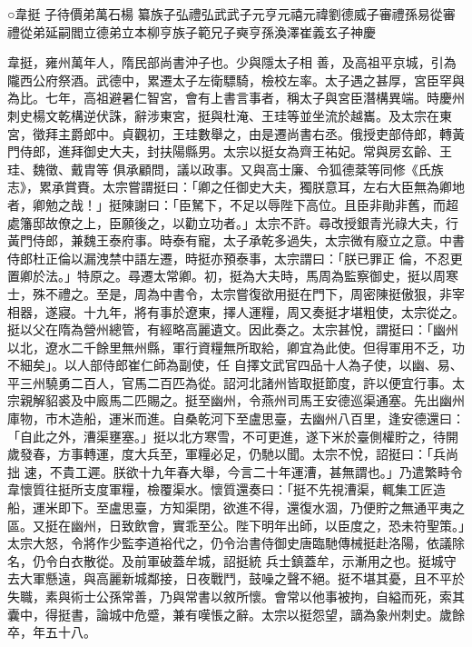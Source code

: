 
\begin{pinyinscope}

 ○韋挺
 子待價弟萬石楊
 纂族子弘禮弘武武子元亨元禧元禕劉德威子審禮孫易從審禮從弟延嗣閻立德弟立本柳亨族子範兄子奭亨孫渙澤崔義玄子神慶



 韋挺，雍州萬年人，隋民部尚書沖子也。少與隱太子相
 善，及高祖平京城，引為隴西公府祭酒。武德中，累遷太子左衛驃騎，檢校左率。太子遇之甚厚，宮臣罕與為比。七年，高祖避暑仁智宮，會有上書言事者，稱太子與宮臣潛構異端。時慶州刺史楊文乾構逆伏誅，辭涉東宮，挺與杜淹、王珪等並坐流於越巂。及太宗在東宮，徵拜主爵郎中。貞觀初，王珪數舉之，由是遷尚書右丞。俄授吏部侍郎，轉黃門侍郎，進拜御史大夫，封扶陽縣男。太宗以挺女為齊王祐妃。常與房玄齡、王珪、魏徵、戴胄等
 俱承顧問，議以政事。又與高士廉、令狐德棻等同修《氏族志》，累承賞賚。太宗嘗謂挺曰：「卿之任御史大夫，獨朕意耳，左右大臣無為卿地者，卿勉之哉！」挺陳謝曰：「臣駑下，不足以辱陛下高位。且臣非勛非舊，而超處籓邸故僚之上，臣願後之，以勸立功者。」太宗不許。尋改授銀青光祿大夫，行黃門侍郎，兼魏王泰府事。時泰有寵，太子承乾多過失，太宗微有廢立之意。中書侍郎杜正倫以漏洩禁中語左遷，時挺亦預泰事，太宗謂曰：「朕已罪正
 倫，不忍更置卿於法。」特原之。尋遷太常卿。初，挺為大夫時，馬周為監察御史，挺以周寒士，殊不禮之。至是，周為中書令，太宗嘗復欲用挺在門下，周密陳挺傲狠，非宰相器，遂寢。十九年，將有事於遼東，擇人運糧，周又奏挺才堪粗使，太宗從之。挺以父在隋為營州總管，有經略高麗遺文。因此奏之。太宗甚悅，謂挺曰：「幽州以北，遼水二千餘里無州縣，軍行資糧無所取給，卿宜為此使。但得軍用不乏，功不細矣」。以人部侍郎崔仁師為副使，任
 自擇文武官四品十人為子使，以幽、易、平三州驍勇二百人，官馬二百匹為從。詔河北諸州皆取挺節度，許以便宜行事。太宗親解貂裘及中廄馬二匹賜之。挺至幽州，令燕州司馬王安德巡渠通塞。先出幽州庫物，市木造船，運米而進。自桑乾河下至盧思臺，去幽州八百里，逢安德還曰：「自此之外，漕渠壅塞。」挺以北方寒雪，不可更進，遂下米於臺側權貯之，待開歲發春，方事轉運，度大兵至，軍糧必足，仍馳以聞。太宗不悅，詔挺曰：「兵尚拙
 速，不貴工遲。朕欲十九年春大舉，今言二十年運漕，甚無謂也。」乃遣繁畤令韋懷質往挺所支度軍糧，檢覆渠水。懷質還奏曰：「挺不先視漕渠，輒集工匠造船，運米即下。至盧思臺，方知渠閉，欲進不得，還復水涸，乃便貯之無通平夷之區。又挺在幽州，日致飲會，實乖至公。陛下明年出師，以臣度之，恐未符聖策。」太宗大怒，令將作少監李道裕代之，仍令治書侍御史唐臨馳傳械挺赴洛陽，依議除名，仍令白衣散從。及前軍破蓋牟城，詔挺統
 兵士鎮蓋牟，示漸用之也。挺城守去大軍懸遠，與高麗新城鄰接，日夜戰鬥，鼓噪之聲不絕。挺不堪其憂，且不平於失職，素與術士公孫常善，乃與常書以敘所懷。會常以他事被拘，自縊而死，索其囊中，得挺書，論城中危蹙，兼有嘆悵之辭。太宗以挺怨望，謫為象州刺史。歲餘卒，年五十八。




\end{pinyinscope}
